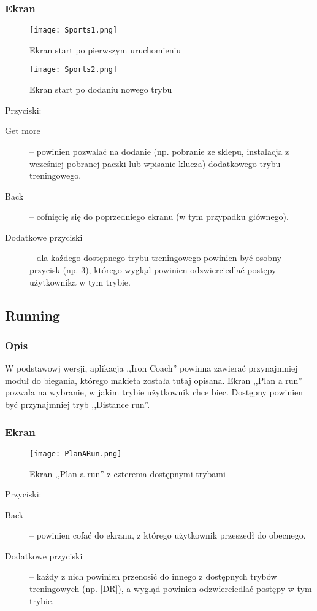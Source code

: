 \subsubsection{Ekran}
\begin{figure}[b!]
  \texttt{[image: Sports1.png]}
  \caption{Ekran start po pierwszym uruchomieniu}
  \label{S1}
\end{figure}
\begin{figure}[b!]
  \texttt{[image: Sports2.png]}
  \caption{Ekran start po dodaniu nowego trybu}
  \label{S2}
\end{figure}
Przyciski:\\
\begin{description}
  \item[Get more] -- powinien pozwalać na dodanie (np. pobranie ze sklepu, instalacja z wcześniej pobranej paczki lub wpisanie klucza) dodatkowego trybu treningowego.
  \item[Back] -- cofnięcię się do poprzedniego ekranu (w tym przypadku głównego).
  \item[Dodatkowe przyciski] -- dla każdego dostępnego trybu treningowego powinien być osobny przycisk (np. \ref{PR}), którego wygląd powinien odzwierciedlać postępy użytkownika w tym trybie.
\end{description}
\subsection{Running}
\subsubsection{Opis}
\noindent W podstawowj wersji, aplikacja ,,Iron Coach'' powinna zawierać przynajmniej moduł do biegania, którego makieta została tutaj opisana. Ekran ,,Plan a run'' pozwala na wybranie, w jakim trybie użytkownik chce biec. Dostępny powinien być przynajmniej tryb ,,Distance run''.
\subsubsection{Ekran}
\begin{figure}[b!]
  \texttt{[image: PlanARun.png]}
  \caption{Ekran ,,Plan a run'' z czterema dostępnymi trybami}
  \label{PR}
\end{figure}
Przyciski:\\
\begin{description}
  \item[Back] -- powinien cofać do ekranu, z którego użytkownik przeszedł do obecnego.
  \item[Dodatkowe przyciski] -- każdy z nich powinien przenosić do innego z dostępnych trybów treningowych (np. \ref{DR}), a wygląd powinien odzwierciedlać postępy w tym trybie.
\end{description}

